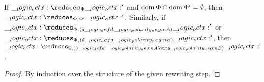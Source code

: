 \begin{lemma}[Weakening]
  If $\octx \reduces_{\orsig} \octx'$ and $\operatorname{dom}{\Phi} \cap \operatorname{dom}{\Phi'} = \emptyset$, then $\octx \reduces_{\orsig, \orsig'} \octx'$.
  Similarly, if $\octx \reduces_{\orsig, (\defp{a} \defd \n{A})} \octx'$ or $\octx \reduces_{\orsig, (\defp{a} \defd \n{B
})} \octx'$, then $\octx \reduces_{\orsig, (\defp{a} \defd \n{A} \with \n{B})} \octx'$.
\end{lemma}
\begin{proof}
  By induction over the structure of the given rewriting step.
\end{proof}

  
  
